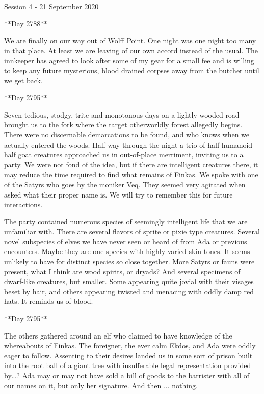 Session 4 - 21 September 2020

**Day 2788**

We are finally on our way out of Wolff Point.  One night was one night too many in that place.  At least we are leaving of our own accord instead of the usual.  The innkeeper has agreed to look after some of my gear for a small fee and is willing to keep any future mysterious, blood drained corpses away from the butcher until we get back.


**Day 2795**

Seven tedious, stodgy, trite and monotonous days on a lightly wooded road brought us to the fork where the target otherworldly forest allegedly begins.  There were no discernable demarcations to be found, and who knows when we actually entered the woods.  Half way through the night a trio of half humanoid half goat creatures approached us in out-of-place merriment, inviting us to a party.  We were not fond of the idea, but if there are intelligent creatures there, it may reduce the time required to find what remains of Finkas.  We spoke with one of the Satyrs who goes by the moniker Veq.  They seemed very agitated when asked what their proper name is.  We will try to remember this for future interactions.

The party contained numerous species of seemingly intelligent life that we are unfamiliar with.  There are several flavors of sprite or pixie type creatures.  Several novel subspecies of elves we have never seen or heard of from Ada or previous encounters.  Maybe they are one species with highly varied skin tones.  It seems unlikely to have for distinct species so close together.  More Satyrs or fauns were present, what I think are wood spirits, or dryads? And several specimens of dwarf-like creatures, but smaller. Some appearing quite jovial with their visages beset by hair, and others appearing twisted and menacing with oddly damp red hats.  It reminds us of blood.


**Day 2795**

The others gathered around an elf who claimed to have knowledge of the whereabouts of Finkas.  The foreigner, the ever calm Ekdos, and Ada were oddly eager to follow.  Assenting to their desires landed us in some sort of prison built into the root ball of a giant tree with  insufferable legal representation provided by…?  Ada may or may not have sold a bill of goods to the barrister with all of our names on it, but only her signature.  And then ... nothing.
